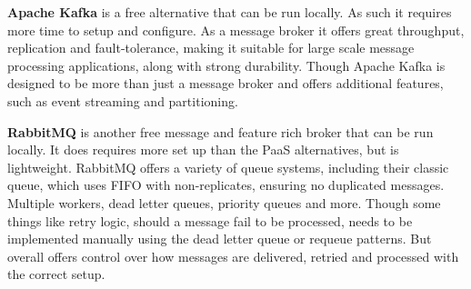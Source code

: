 \textbf{Apache Kafka} is a free alternative that can be run locally. As such it requires more time to setup and configure. As a message broker it offers great throughput, replication and fault-tolerance, making it suitable for large scale message processing applications, along with strong durability. Though Apache Kafka is designed to be more than just a message broker and offers additional features, such as event streaming and partitioning\cite{kafka_docs}.

\textbf{RabbitMQ} is another free message and feature rich broker that can be run locally. It does requires more set up than the PaaS alternatives, but is lightweight. RabbitMQ  offers a variety of queue systems, including their classic queue, which uses FIFO with non-replicates, ensuring no duplicated messages. Multiple workers, dead letter queues, priority queues and more. Though some things like retry logic, should a message fail to be processed, needs to be implemented manually using the dead letter queue or requeue patterns. But overall offers control over how messages are delivered, retried and processed with the correct setup\cite{rabbitmq_docs}.
 